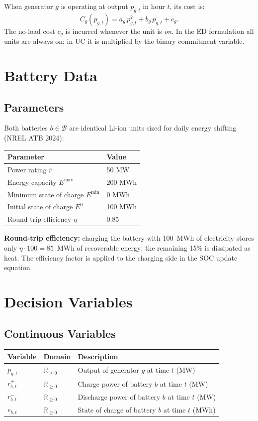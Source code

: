 \documentclass[11pt, letterpaper]{article}
\begin{document}
When generator $g$ is operating at output $p_{g,t}$ in hour $t$, its cost is:
\[
  C_g(p_{g,t}) = a_g\, p_{g,t}^2 + b_g\, p_{g,t} + c_g.
\]
The no-load cost $c_g$ is incurred whenever the unit is \emph{on}. In the ED
formulation all units are always on; in UC it is multiplied by the binary
commitment variable.

\section{Battery Data}

\subsection{Parameters}

Both batteries $b \in \mathcal{B}$ are identical Li-ion units sized for daily
energy shifting (NREL ATB 2024):

\begin{tabular}{@{}ll@{}}
  \toprule
  Parameter & Value \\
  \midrule
  Power rating $\bar{r}$ & 50 MW \\
  Energy capacity $E^{\max}$ & 200 MWh \\
  Minimum state of charge $E^{\min}$ & 0 MWh \\
  Initial state of charge $E^0$ & 100 MWh \\
  Round-trip efficiency $\eta$ & 0.85 \\
  \bottomrule
\end{tabular}

\vspace{0.5em}
\textbf{Round-trip efficiency:} charging the battery with 100~MWh of electricity
stores only $\eta \cdot 100 = 85$~MWh of recoverable energy; the remaining 15\%
is dissipated as heat. The efficiency factor is applied to the charging side in the
SOC update equation.

\section{Decision Variables}

\subsection{Continuous Variables}

\begin{tabular}{@{}lll@{}}
  \toprule
  Variable & Domain & Description \\
  \midrule
  $p_{g,t}$       & $\mathbb{R}_{\geq 0}$ & Output of generator $g$ at time $t$ (MW) \\
  $r^+_{b,t}$     & $\mathbb{R}_{\geq 0}$ & Charge power of battery $b$ at time $t$ (MW) \\
  $r^-_{b,t}$     & $\mathbb{R}_{\geq 0}$ & Discharge power of battery $b$ at time $t$ (MW) \\
  $e_{b,t}$       & $\mathbb{R}_{\geq 0}$ & State of charge of battery $b$ at time $t$ (MWh) \\
  \bottomrule
\end{tabular}
\end{document}
